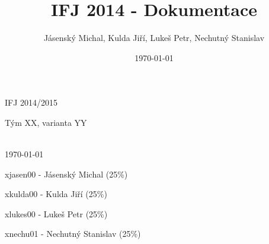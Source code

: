 \documentclass[a4paper]{article}
\title{IFJ 2014 - Dokumentace}
\author{Jásenský Michal, Kulda Jiří, Lukeš Petr, Nechutný Stanislav}
\date{\today}
\begin{document}
\begin{center}
	\begin{LARGE}IFJ 2014/2015\end{LARGE}

	\begin{Large}Tým XX, varianta YY\end{Large}
	\\ [6in]
	
	\today
\end{center}

	xjasen00 - Jásenský Michal (25\%)

	xkulda00 - Kulda Jiří  (25\%)
	
	xlukes00 - Lukeš Petr  (25\%)
	
	xnechu01 - Nechutný Stanislav  (25\%)


	


\pagebreak
\end{document}
